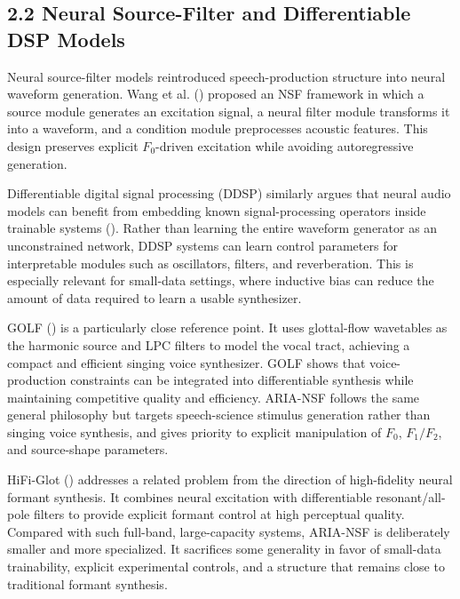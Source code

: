 \subsection{2.2 Neural Source-Filter and Differentiable DSP
Models}\label{neural-source-filter-and-differentiable-dsp-models}

Neural source-filter models reintroduced speech-production structure
into neural waveform generation. Wang et al.
() proposed an NSF framework in which a
source module generates an excitation signal, a neural filter module
transforms it into a waveform, and a condition module preprocesses
acoustic features. This design preserves explicit \(F_0\)-driven
excitation while avoiding autoregressive generation.

Differentiable digital signal processing (DDSP) similarly argues that
neural audio models can benefit from embedding known signal-processing
operators inside trainable systems (). Rather than learning the entire waveform generator as an
unconstrained network, DDSP systems can learn control parameters for
interpretable modules such as oscillators, filters, and reverberation.
This is especially relevant for small-data settings, where inductive
bias can reduce the amount of data required to learn a usable
synthesizer.

GOLF () is a particularly
close reference point. It uses glottal-flow wavetables as the harmonic
source and LPC filters to model the vocal tract, achieving a compact and
efficient singing voice synthesizer. GOLF shows that voice-production
constraints can be integrated into differentiable synthesis while
maintaining competitive quality and efficiency. ARIA-NSF follows the
same general philosophy but targets speech-science stimulus generation
rather than singing voice synthesis, and gives priority to explicit
manipulation of \(F_0\), \(F_1/F_2\), and source-shape parameters.

HiFi-Glot () addresses a
related problem from the direction of high-fidelity neural formant
synthesis. It combines neural excitation with differentiable
resonant/all-pole filters to provide explicit formant control at high
perceptual quality. Compared with such full-band, large-capacity
systems, ARIA-NSF is deliberately smaller and more specialized. It
sacrifices some generality in favor of small-data trainability, explicit
experimental controls, and a structure that remains close to traditional
formant synthesis.

